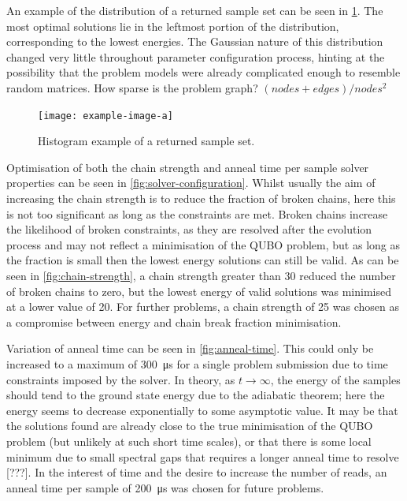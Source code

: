 \documentclass[12pt]{article}
\theoremstyle{definition}
\begin{document}
An example of the distribution of a returned sample set can be seen in \cref{fig:histogram}. The most optimal solutions lie in the leftmost portion of the distribution, corresponding to the lowest energies. The Gaussian nature of this distribution changed very little throughout parameter configuration process, hinting at the possibility that the problem models were already complicated enough to resemble random matrices. How sparse is the problem graph? $(nodes + edges)/nodes^2$

\begin{figure}
    \centering
    \texttt{[image: example-image-a]}
    \caption{Histogram example of a returned sample set.}
    \label{fig:histogram}
\end{figure}

Optimisation of both the chain strength and anneal time per sample solver properties can be seen in \cref{fig:solver-configuration}. Whilst usually the aim of increasing the chain strength is to reduce the fraction of broken chains, here this is not too significant as long as the constraints are met. Broken chains increase the likelihood of broken constraints, as they are resolved after the evolution process and may not reflect a minimisation of the QUBO problem, but as long as the fraction is small then the lowest energy solutions can still be valid. As can be seen in \cref{fig:chain-strength}, a chain strength greater than \num{30} reduced the number of broken chains to zero, but the lowest energy of valid solutions was minimised at a lower value of \num{20}. For further problems, a chain strength of \num{25} was chosen as a compromise between energy and chain break fraction minimisation.

Variation of anneal time can be seen in \cref{fig:anneal-time}. This could only be increased to a maximum of \qty{300}{\us} for a single problem submission due to time constraints imposed by the solver. In theory, as $t\to\infty$, the energy of the samples should tend to the ground state energy due to the adiabatic theorem; here the energy seems to decrease exponentially to some asymptotic value. It may be that the solutions found are already close to the true minimisation of the QUBO problem (but unlikely at such short time scales), or that there is some local minimum due to small spectral gaps that requires a longer anneal time to resolve [???]. In the interest of time and the desire to increase the number of reads, an anneal time per sample of \qty{200}{\us} was chosen for future problems.
\end{document}
